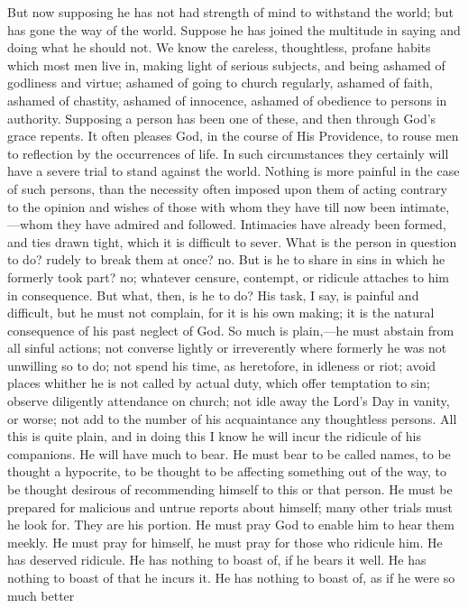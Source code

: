 But now supposing he has not had strength of mind to withstand the
world; but has gone the way of the world. Suppose he has joined the
multitude in saying and doing what he should not. We know the
careless, thoughtless, profane habits which most men live in, making
light of serious subjects, and being ashamed of godliness and virtue;
ashamed of going to church regularly, ashamed of faith, ashamed of
chastity, ashamed of innocence, ashamed of obedience to persons in
authority. Supposing a person has been one of these, and then through
God's grace repents. It often pleases God, in the course of His
Providence, to rouse men to reflection by the occurrences of life. In
such circumstances they certainly will have a severe trial to stand
against the world. Nothing is more painful in the case of such
persons, than the necessity often imposed upon them of acting contrary
to the opinion and wishes of those with whom they have till now been
intimate,—whom they have admired and followed. Intimacies have
already been formed, and ties drawn tight, which it is difficult to
sever. What is the person in question to do? rudely to break them at
once? no. But is he to share in sins in which he formerly took part?
no; whatever censure, contempt, or ridicule attaches to him in
consequence. But what, then, is he to do? His task, I say, is painful
and difficult, but he must not complain, for it is his own making; it
is the natural consequence of his past neglect of God. So much is
plain,—he must abstain from all sinful actions; not converse lightly
or irreverently where formerly he was not unwilling so to do; not
spend his time, as heretofore, in idleness or riot; avoid places
whither he is not called by actual duty, which offer temptation to
sin; observe diligently attendance on church; not idle away the Lord's
Day in vanity, or worse; not add to the number of his acquaintance any
thoughtless persons. All this is quite plain, and in doing this I know
he will incur the ridicule of his companions. He will have much to
bear. He must bear to be called names, to be thought a hypocrite, to
be thought to be affecting something out of the way, to be thought
desirous of recommending himself to this or that person. He must be
prepared for malicious and untrue reports about himself; many other
trials must he look for. They are his portion. He must pray God to
enable him to hear them meekly. He must pray for himself, he must pray
for those who ridicule him. He has deserved ridicule. He has nothing
to boast of, if he bears it well. He has nothing to boast of that he
incurs it. He has nothing to boast of, as if he were so much better
